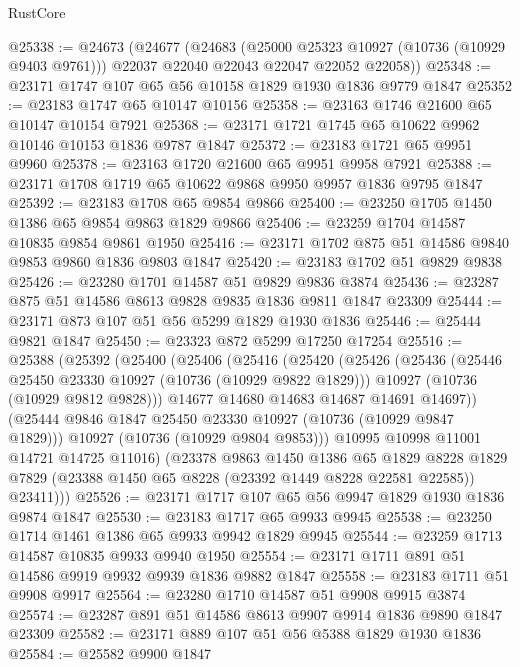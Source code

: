 \begin{lexlean}{RustCore}
\begin{coremodule}
@25338 := @24673
    (@24677
      (@24683
        (@25000 @25323 @10927 (@10736 (@10929 @9403 @9761)))
        @22037
        @22040
        @22043
        @22047
        @22052
        @22058))
@25348 := @23171 @1747 @107 @65 @56 @10158 @1829 @1930 @1836 @9779 @1847
@25352 := @23183 @1747 @65 @10147 @10156
@25358 := @23163 @1746 @21600 @65 @10147 @10154 @7921
@25368 := @23171 @1721 @1745 @65 @10622 @9962 @10146 @10153 @1836 @9787 @1847
@25372 := @23183 @1721 @65 @9951 @9960
@25378 := @23163 @1720 @21600 @65 @9951 @9958 @7921
@25388 := @23171 @1708 @1719 @65 @10622 @9868 @9950 @9957 @1836 @9795 @1847
@25392 := @23183 @1708 @65 @9854 @9866
@25400 := @23250 @1705 @1450 @1386 @65 @9854 @9863 @1829 @9866
@25406 := @23259 @1704 @14587 @10835 @9854 @9861 @1950
@25416 := @23171 @1702 @875 @51 @14586 @9840 @9853 @9860 @1836 @9803 @1847
@25420 := @23183 @1702 @51 @9829 @9838
@25426 := @23280 @1701 @14587 @51 @9829 @9836 @3874
@25436 := @23287 @875 @51 @14586 @8613 @9828 @9835 @1836 @9811 @1847 @23309
@25444 := @23171 @873 @107 @51 @56 @5299 @1829 @1930 @1836
@25446 := @25444 @9821 @1847
@25450 := @23323 @872 @5299 @17250 @17254
@25516 := @25388
    (@25392
      (@25400
        (@25406
          (@25416
            (@25420
              (@25426
                (@25436
                  (@25446 @25450 @23330 @10927 (@10736 (@10929 @9822 @1829)))
                  @10927
                  (@10736 (@10929 @9812 @9828)))
                @14677
                @14680
                @14683
                @14687
                @14691
                @14697))
            (@25444 @9846 @1847 @25450 @23330 @10927 (@10736 (@10929 @9847 @1829)))
            @10927
            (@10736 (@10929 @9804 @9853)))
          @10995
          @10998
          @11001
          @14721
          @14725
          @11016)
        (@23378
          @9863
          @1450
          @1386
          @65
          @1829
          @8228
          @1829
          @7829
          (@23388 @1450 @65 @8228 (@23392 @1449 @8228 @22581 @22585))
          @23411)))
@25526 := @23171 @1717 @107 @65 @56 @9947 @1829 @1930 @1836 @9874 @1847
@25530 := @23183 @1717 @65 @9933 @9945
@25538 := @23250 @1714 @1461 @1386 @65 @9933 @9942 @1829 @9945
@25544 := @23259 @1713 @14587 @10835 @9933 @9940 @1950
@25554 := @23171 @1711 @891 @51 @14586 @9919 @9932 @9939 @1836 @9882 @1847
@25558 := @23183 @1711 @51 @9908 @9917
@25564 := @23280 @1710 @14587 @51 @9908 @9915 @3874
@25574 := @23287 @891 @51 @14586 @8613 @9907 @9914 @1836 @9890 @1847 @23309
@25582 := @23171 @889 @107 @51 @56 @5388 @1829 @1930 @1836
@25584 := @25582 @9900 @1847

\end{coremodule}
\end{lexlean}
